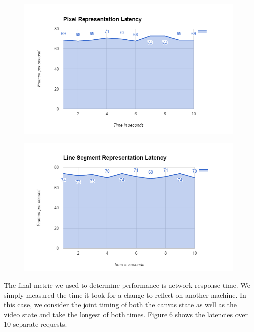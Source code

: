 \documentclass[conference]{IEEEtran}
\begin{document}
    \begin{figure}[H]
      \centering
      \includegraphics[width=\linewidth]{figure3a.PNG}
      \caption{}
      \label{fig:my_label}
    \end{figure}
    \begin{figure}[H]
      \centering
      \includegraphics[width=\linewidth]{figure3b.PNG}
      \caption{}
      \label{fig:my_label}
    \end{figure}

    The final metric we used to determine performance is network response time. We simply measured the time it took for a change to reflect on another machine. In this case, we consider the joint timing of both the canvas state as well as the video state and take the longest of both times. Figure 6 shows the latencies over 10 separate requests.
\end{document}
